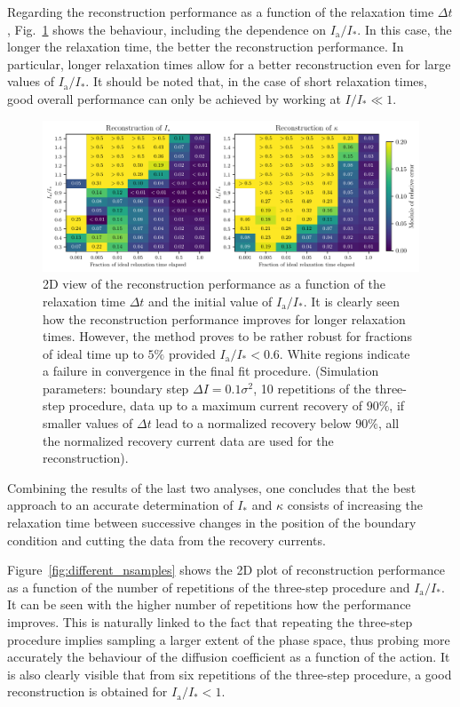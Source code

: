 Regarding the reconstruction performance as a function of the relaxation time $\Delta t$, Fig.~\ref{fig:different_time} shows the behaviour, including the dependence on $I_\mathrm{a}/I_\ast$. In this case, the longer the relaxation time, the better the reconstruction performance. In particular, longer relaxation times allow for a better reconstruction even for large values of $I_\mathrm{a}/I_\ast$. It should be noted that, in the case of short relaxation times, good overall performance can only be achieved by working at $I/I_\ast \ll 1$.
%
\begin{figure}[htp]
    \centering
    \includegraphics[width=\textwidth]{4_probing_the_diffusive_behavior/figs/final/MULTI_different_time.pdf}
    \caption{2D view of the reconstruction performance as a function of the relaxation time $\Delta t$ and the initial value of $I_\mathrm{a}/I_\ast$. It is clearly seen how the reconstruction performance improves for longer relaxation times. However, the method proves to be rather robust for fractions of ideal time up to $5\%$ provided $I_\mathrm{a}/I_\ast < 0.6$. White regions indicate a failure in convergence in the final fit procedure. (Simulation parameters: boundary step $\Delta I=0.1 \sigma^2$, 10 repetitions of the three-step procedure, data up to a maximum current recovery of $90\%$, if smaller values of $\Delta t$ lead to a normalized recovery below $90\%$, all the normalized recovery current data are used for the reconstruction).}
    \label{fig:different_time}
\end{figure}
%
Combining the results of the last two analyses, one concludes that the best approach to an accurate determination of $I_\ast$ and $\kappa$ consists of increasing the relaxation time between successive changes in the position of the boundary condition and cutting the data from the recovery currents. 

Figure~\ref{fig:different_nsamples} shows the 2D plot of reconstruction performance as a function of the number of repetitions of the three-step procedure and $I_\mathrm{a}/I_\ast$. It can be seen with the higher number of repetitions how the performance improves. This is naturally linked to the fact that repeating the three-step procedure implies sampling a larger extent of the phase space, thus probing more accurately the behaviour of the diffusion coefficient as a function of the action. It is also clearly visible that from six repetitions of the three-step procedure, a good reconstruction is obtained for $I_\mathrm{a}/I_\ast < 1$.

